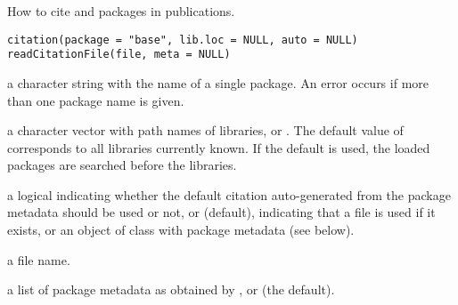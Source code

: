 %
\begin{Description}\relax
How to cite \R{} and \R{} packages in publications.
\end{Description}
%
\begin{Usage}
\begin{verbatim}
citation(package = "base", lib.loc = NULL, auto = NULL)
readCitationFile(file, meta = NULL)
\end{verbatim}
\end{Usage}
%
\begin{Arguments}
\begin{ldescription}
\item[\code{package}] a character string with the name of a single package.
An error occurs if more than one package name is given.
\item[\code{lib.loc}] a character vector with path names of \R{} libraries, or
.  The default value of  corresponds to all
libraries currently known.  If the default is used, the loaded
packages are searched before the libraries.
\item[\code{auto}] a logical indicating whether the default citation
auto-generated from the package  metadata should
be used or not, or  (default), indicating that a
 file is used if it exists, or an object of class
 with package metadata (see
below).
\item[\code{file}] a file name.
\item[\code{meta}] a list of package metadata as obtained by
, or  (the default).
\end{ldescription}
\end{Arguments}
%
